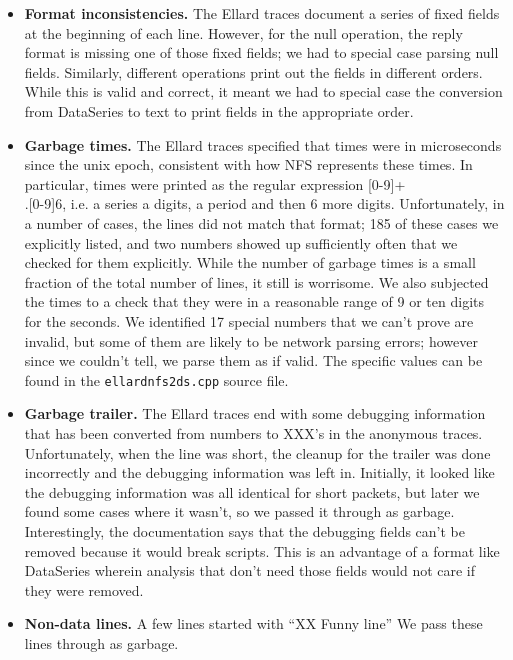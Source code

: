 \documentclass[twocolumn, 11pt]{article}
\begin{document}
\begin{itemize}
\item {\bf Format inconsistencies.} The Ellard traces document a
series of fixed fields at the beginning of each line.  However, for
the null operation, the reply format is missing one of those fixed
fields; we had to special case parsing null fields.  Similarly,
different operations print out the fields in different orders.  While
this is valid and correct, it meant we had to special case the
conversion from DataSeries to text to print fields in the appropriate
order.

\item {\bf Garbage times.} The Ellard traces specified that times were
in microseconds since the unix epoch, consistent with how NFS
represents these times.  In particular, times were printed as the
regular expression [0-9]+\\.[0-9]{6}, i.e. a series a digits, a period
and then 6 more digits.  Unfortunately, in a number of cases, the
lines did not match that format; 185 of these cases we explicitly
listed, and two numbers showed up sufficiently often that we checked
for them explicitly.  While the number of garbage times is a small
fraction of the total number of lines, it still is worrisome.  We also
subjected the times to a check that they were in a reasonable range of
9 or ten digits for the seconds.  We identified 17 special numbers
that we can't prove are invalid, but some of them are likely to be
network parsing errors; however since we couldn't tell, we parse them
as if valid.  The specific values can be found in the
\texttt{ellardnfs2ds.cpp} source file.

\item {\bf Garbage trailer.}  The Ellard traces end with some
debugging information that has been converted from numbers to XXX's in
the anonymous traces.  Unfortunately, when the line was short, the
cleanup for the trailer was done incorrectly and the debugging
information was left in.  Initially, it looked like the debugging
information was all identical for short packets, but later we found
some cases where it wasn't, so we passed it through as garbage.
Interestingly, the documentation says that the debugging fields can't
be removed because it would break scripts.  This is an advantage of a
format like DataSeries wherein analysis that don't need those fields
would not care if they were removed.

\item {\bf Non-data lines.}  A few lines started with ``XX Funny
line'' We pass these lines through as garbage.


\end{itemize}
\end{document}
